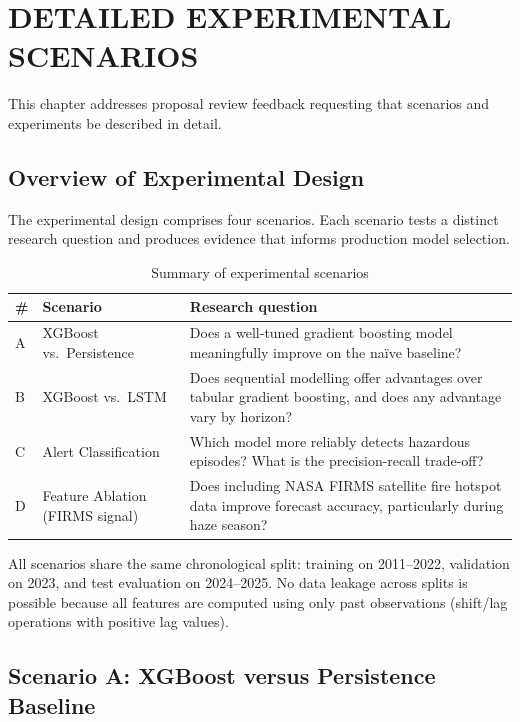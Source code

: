 \documentclass[12pt,a4paper]{report}
\begin{document}
\chapter{DETAILED EXPERIMENTAL SCENARIOS}

This chapter addresses proposal review feedback requesting that scenarios and experiments be described in detail.

\section{Overview of Experimental Design}

The experimental design comprises four scenarios. Each scenario tests a distinct research question and produces evidence that informs production model selection.

\begin{table}[H]
\centering
\caption{Summary of experimental scenarios}
\label{tab:scenarios_summary}
\begin{tabularx}{\textwidth}{@{}p{0.6cm}p{3.2cm}X@{}}
\toprule
\textbf{\#} & \textbf{Scenario} & \textbf{Research question} \\
\midrule
A & XGBoost vs.\ Persistence       & Does a well-tuned gradient boosting model meaningfully improve on the na\"ive baseline? \\
B & XGBoost vs.\ LSTM              & Does sequential modelling offer advantages over tabular gradient boosting, and does any advantage vary by horizon? \\
C & Alert Classification            & Which model more reliably detects hazardous episodes? What is the precision-recall trade-off? \\
D & Feature Ablation (FIRMS signal) & Does including NASA FIRMS satellite fire hotspot data improve forecast accuracy, particularly during haze season? \\
\bottomrule
\end{tabularx}
\end{table}

All scenarios share the same chronological split: training on 2011--2022, validation on 2023, and test evaluation on 2024--2025. No data leakage across splits is possible because all features are computed using only past observations (shift/lag operations with positive lag values).

\section{Scenario A: XGBoost versus Persistence Baseline}
\end{document}
